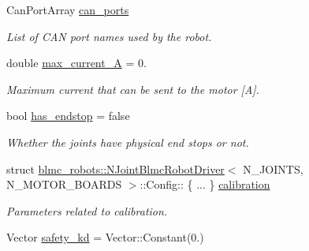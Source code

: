 \begin{DoxyCompactItemize}
\item 
Can\+Port\+Array \hyperlink{structblmc__robots_1_1NJointBlmcRobotDriver_1_1Config_a849381580e6d6d0768e6a4e04a394cfd}{can\+\_\+ports}
\begin{DoxyCompactList}\small\item\em List of C\+AN port names used by the robot. \end{DoxyCompactList}\item 
double \hyperlink{structblmc__robots_1_1NJointBlmcRobotDriver_1_1Config_ab7f483ae02a0c026981c223c97c462c5}{max\+\_\+current\+\_\+A} = 0.\hypertarget{structblmc__robots_1_1NJointBlmcRobotDriver_1_1Config_ab7f483ae02a0c026981c223c97c462c5}{}\label{structblmc__robots_1_1NJointBlmcRobotDriver_1_1Config_ab7f483ae02a0c026981c223c97c462c5}

\begin{DoxyCompactList}\small\item\em Maximum current that can be sent to the motor \mbox{[}A\mbox{]}. \end{DoxyCompactList}\item 
bool \hyperlink{structblmc__robots_1_1NJointBlmcRobotDriver_1_1Config_a8cbf3c740b0cae7afb7170d51e04b60d}{has\+\_\+endstop} = false
\begin{DoxyCompactList}\small\item\em Whether the joints have physical end stops or not. \end{DoxyCompactList}\item 
struct \hyperlink{classblmc__robots_1_1NJointBlmcRobotDriver}{blmc\+\_\+robots\+::\+N\+Joint\+Blmc\+Robot\+Driver}$<$ N\+\_\+\+J\+O\+I\+N\+TS, N\+\_\+\+M\+O\+T\+O\+R\+\_\+\+B\+O\+A\+R\+DS $>$\+::Config\+:: \{ ... \}  \hyperlink{structblmc__robots_1_1NJointBlmcRobotDriver_1_1Config_af8b6a47f77f116d4749cf0ea2344727e}{calibration}\hypertarget{structblmc__robots_1_1NJointBlmcRobotDriver_1_1Config_af8b6a47f77f116d4749cf0ea2344727e}{}\label{structblmc__robots_1_1NJointBlmcRobotDriver_1_1Config_af8b6a47f77f116d4749cf0ea2344727e}

\begin{DoxyCompactList}\small\item\em Parameters related to calibration. \end{DoxyCompactList}\item 
Vector \hyperlink{structblmc__robots_1_1NJointBlmcRobotDriver_1_1Config_a6548c1cc2f3c2789d44c01e2e3d24e11}{safety\+\_\+kd} = Vector\+::\+Constant(0.)\hypertarget{structblmc__robots_1_1NJointBlmcRobotDriver_1_1Config_a6548c1cc2f3c2789d44c01e2e3d24e11}{}\label{structblmc__robots_1_1NJointBlmcRobotDriver_1_1Config_a6548c1cc2f3c2789d44c01e2e3d24e11}


\end{DoxyCompactItemize}
